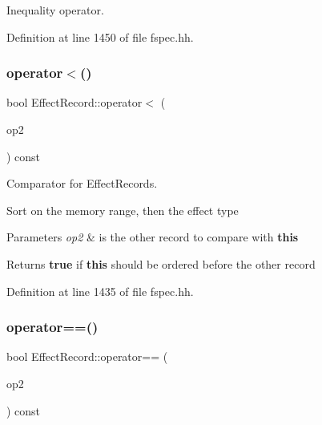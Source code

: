 Inequality operator. 



Definition at line 1450 of file fspec.\+hh.

\mbox{\label{class_effect_record_a2d5a13546e325d96f0224cb5a8b09403}} 
\subsubsection{\texorpdfstring{operator$<$()}{operator<()}}
{\footnotesize\ttfamily bool Effect\+Record\+::operator$<$ (\begin{DoxyParamCaption}\item[{const \mbox{\hyperlink{class_effect_record}{Effect\+Record}} \&}]{op2 }\end{DoxyParamCaption}) const\hspace{0.3cm}{\ttfamily [inline]}}



Comparator for Effect\+Records. 

Sort on the memory range, then the effect type 
\begin{DoxyParams}{Parameters}
{\em op2} & is the other record to compare with {\bfseries{this}} \\
\hline
\end{DoxyParams}
\begin{DoxyReturn}{Returns}
{\bfseries{true}} if {\bfseries{this}} should be ordered before the other record 
\end{DoxyReturn}


Definition at line 1435 of file fspec.\+hh.

\mbox{\label{class_effect_record_a2836f374f09e7ed7839505f5dd8b17b7}} 
\subsubsection{\texorpdfstring{operator==()}{operator==()}}
{\footnotesize\ttfamily bool Effect\+Record\+::operator== (\begin{DoxyParamCaption}\item[{const \mbox{\hyperlink{class_effect_record}{Effect\+Record}} \&}]{op2 }\end{DoxyParamCaption}) const\hspace{0.3cm}{\ttfamily [inline]}}




